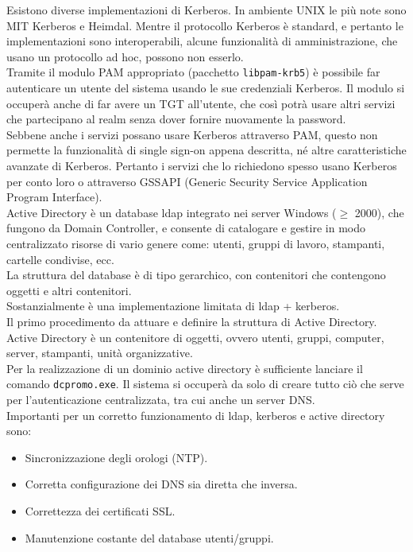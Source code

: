 \documentclass[a4paper]{report}
\begin{document}
Esistono diverse implementazioni di Kerberos. In ambiente UNIX le più note
sono MIT Kerberos e Heimdal. Mentre il protocollo Kerberos è standard, e
pertanto le implementazioni sono interoperabili, alcune funzionalità di
amministrazione, che usano un protocollo ad hoc, possono non esserlo.
\\Tramite il modulo PAM appropriato (pacchetto \texttt{libpam-krb5})
è possibile
far autenticare un utente del sistema usando le sue credenziali Kerberos. Il
modulo si occuperà anche di far avere un TGT all'utente, che così potrà
usare altri servizi che partecipano al realm senza dover fornire nuovamente
la password.
\\Sebbene anche i servizi possano usare Kerberos attraverso PAM, questo
non permette la funzionalità di single sign-on appena descritta, né altre
caratteristiche avanzate di Kerberos. Pertanto i servizi che lo richiedono
spesso usano Kerberos per conto loro o attraverso GSSAPI (Generic
Security Service Application Program Interface).\\
Active Directory è un database ldap integrato nei server Windows
($\geq$ 2000), che fungono da Domain Controller, e consente di catalogare e
gestire in modo centralizzato risorse di vario genere come: utenti, gruppi di
lavoro, stampanti, cartelle condivise, ecc.
\\La struttura del database è di tipo gerarchico, con contenitori che
contengono oggetti e altri contenitori.
\\Sostanzialmente è una implementazione limitata di ldap + kerberos.
\\Il primo procedimento da attuare e definire la struttura di Active Directory.
Active Directory è un contenitore di oggetti, ovvero utenti, gruppi, computer,
server, stampanti, unità organizzative.
\\Per la realizzazione di un dominio active directory è sufficiente lanciare il
comando \texttt{dcpromo.exe}. Il sistema si occuperà da solo di creare tutto ciò
che serve per l'autenticazione centralizzata, tra cui anche un server DNS.\\
Importanti per un corretto funzionamento di
ldap, kerberos e active directory sono:
\begin{itemize}
\item Sincronizzazione degli orologi (NTP).
\item Corretta configurazione dei DNS sia diretta che
inversa.
\item Correttezza dei certificati SSL.
\item Manutenzione costante del database utenti/gruppi.
\end{itemize}
\end{document}
